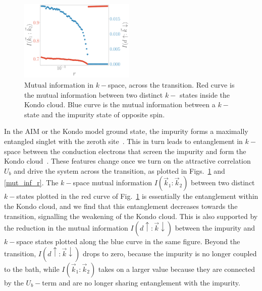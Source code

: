 \documentclass[reprint,superscriptaddress,floatfix]{revtex4-2}
\begin{document}
\begin{figure}[!htb]
\includegraphics[width=0.49\textwidth]{I_k.pdf}
\caption{Mutual information in \(k-\)space, across the transition. Red curve is the mutual information between two distinct \(k-\) states inside the Kondo cloud. Blue curve is the mutual information between a \(k-\)state and the impurity state of opposite spin.}
\label{mut_inf_k}
\end{figure}

In the AIM or the Kondo model ground state, the impurity forms a maximally entangled singlet with the zeroth site~\cite{wilson1975,hewson1993,hrk_wilson_1980}.
This in turn leads to entanglement in \(k-\)space between the conduction electrons that screen the impurity and form the Kondo cloud~\cite{anirban_kondo}.
These features change once we turn on the attractive correlation \(U_b\) and drive the system across the transition, as plotted in Figs.~\ref{mut_inf_k} and \ref{mut_inf_r}.
The \(k-\)space mutual information \(I(\vec k_1:\vec k_2)\) between two distinct \(k-\)states plotted in the red curve of Fig.~\ref{mut_inf_k} is essentially the entanglement within the Kondo cloud, and we find that this entanglement decreases towards the transition, signalling the weakening of the Kondo cloud.
This is also supported by the reduction in the mutual information \(I(d \uparrow: \vec k \downarrow)\) between the impurity and \(k-\)space states plotted along the blue curve in the same figure. Beyond the transition, \(I(d \uparrow: \vec k \downarrow)\) drops to zero, because the impurity is no longer coupled to the bath, while \(I(\vec k_1:\vec k_2)\) takes on a larger value because they are connected by the \(U_b-\)term and are no longer sharing entanglement with the impurity.
\end{document}
